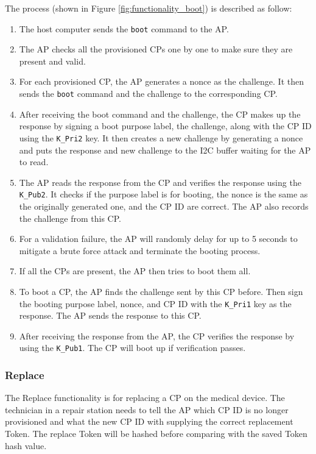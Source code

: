 \documentclass[11pt,oneside,onecolumn,letterpaper]{article}
\begin{document}
	The process (shown in Figure \ref{fig:functionality_boot}) is described as follow:
	\begin{enumerate}
		\item The host computer sends the \texttt{boot} command to the AP.
		\item The AP checks all the provisioned CPs one by one to make sure they are present and valid.
		\item For each provisioned CP,
		the AP generates a nonce as the challenge.
		It then sends the \texttt{boot} command and the challenge to the corresponding CP.
		\item After receiving the boot command and the challenge,
		the CP makes up the response by signing a boot purpose label,
		the challenge,
		along with the CP ID using the \texttt{K\_Pri2} key.
		It then creates a new challenge by generating a nonce and puts the response and new challenge to the I2C buffer waiting for the AP to read.
		\item The AP reads the response from the CP and verifies the response using the \texttt{K\_Pub2}.
		It checks if the purpose label is for booting,
		the nonce is the same as the originally generated one,
		and the CP ID are correct.
		The AP also records the challenge from this CP.
		\item For a validation failure,
		the AP will randomly delay for up to 5 seconds to mitigate a brute force attack and terminate the booting process.
		\item If all the CPs are present,
		the AP then tries to boot them all.
		\item To boot a CP,
		the AP finds the challenge sent by this CP before.
		Then sign the booting purpose label, nonce, and CP ID with the \texttt{K\_Pri1} key as the response.
		The AP sends the response to this CP.
		\item After receiving the response from the AP,
		the CP verifies the response by using the \texttt{K\_Pub1}.
		The CP will boot up if verification passes.
	\end{enumerate}
	
	\subsubsection{Replace}
	The Replace functionality is for replacing a CP on the medical device.
	The technician in a repair station needs to tell the AP which CP ID is no longer provisioned and what the new CP ID with supplying the correct replacement Token.
	The replace Token will be hashed before comparing with the saved Token hash value.
	
\end{document}
